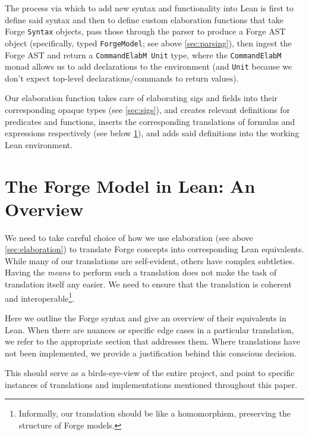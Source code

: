 The process via which to add new syntax and functionality into Lean is first to define said syntax and then to define custom elaboration functions that take Forge \texttt{Syntax} objects, pass those through the parser to produce a Forge AST object (specifically, typed \texttt{ForgeModel}; see above \cref{sec:parsing}), then ingest the Forge AST and return a \texttt{CommandElabM Unit} type, where the \texttt{CommandElabM} monad allows us to add declarations to the environment (and \texttt{Unit} because we don't expect top-level declarations/commands to return values). 

Our elaboration function takes care of elaborating sigs and fields into their corresponding opaque types (see \cref{sec:sigs}), and creates relevant definitions for predicates and functions, inserts the corresponding translations of formulas and expressions respectively (see below \cref{sec:forge-model}), and adds said definitions into the working Lean environment.

\newpage
\section{The Forge Model in Lean: An Overview}\label{sec:forge-model}
We need to take careful choice of how we use elaboration (see above \cref{sec:elaboration}) to translate Forge concepts into corresponding Lean equivalents. While many of our translations are self-evident, others have complex subtleties. Having the \emph{means} to perform such a translation does not make the task of translation itself any easier. We need to ensure that the translation is coherent and interoperable\footnote{Informally, our translation should be like a homomorphism, preserving the structure of Forge models.}. 

Here we outline the Forge syntax and give an overview of their equivalents in Lean. When there are nuances or specific edge cases in a particular translation, we refer to the appropriate section that addresses them. Where translations have not been implemented, we provide a justification behind this conscious decision. 

This should serve as a birds-eye-view of the entire project, and point to specific instances of translations and implementations mentioned throughout this paper. 

